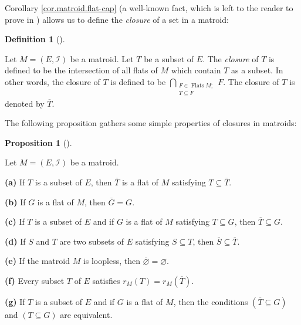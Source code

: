\documentclass[numbers=enddot,12pt,final,onecolumn,notitlepage]{scrartcl}%
\theoremstyle{definition}
\newtheorem{prop}[theo]{Proposition}
\newenvironment{proposition}[1][]
{\begin{prop}[#1]\begin{leftbar}}
{\end{leftbar}\end{prop}}
\newtheorem{defi}[theo]{Definition}
\newenvironment{definition}[1][]
{\begin{defi}[#1]\begin{leftbar}}
{\end{leftbar}\end{defi}}
\let\bigcapnonlimits\bigcap
\renewcommand{\bigcap}{\bigcapnonlimits\limits}
\begin{document}
Corollary \ref{cor.matroid.flat-cap} (a well-known fact, which is left to the
reader to prove in \cite[\S 3.1]{Stanley}) allows us to define the
\emph{closure} of a set in a matroid:

\begin{definition}
\label{def.matroid.closure}Let $M=\left(  E,\mathcal{I}\right)  $ be a
matroid. Let $T$ be a subset of $E$. The \emph{closure} of $T$ is defined to
be the intersection of all flats of $M$ which contain $T$ as a subset. In
other words, the closure of $T$ is defined to be $\bigcap_{\substack{F\in
\operatorname*{Flats}M;\\T\subseteq F}}F$. The closure of $T$ is denoted by
$\overline{T}$.
\end{definition}

The following proposition gathers some simple properties of closures in matroids:

\begin{proposition}
\label{prop.matroid.closure.props}Let $M=\left(  E,\mathcal{I}\right)  $ be a matroid.

\textbf{(a)} If $T$ is a subset of $E$, then $\overline{T}$ is a flat of $M$
satisfying $T\subseteq\overline{T}$.

\textbf{(b)} If $G$ is a flat of $M$, then $\overline{G}=G$.

\textbf{(c)} If $T$ is a subset of $E$ and if $G$ is a flat of $M$ satisfying
$T\subseteq G$, then $\overline{T}\subseteq G$.

\textbf{(d)} If $S$ and $T$ are two subsets of $E$ satisfying $S\subseteq T$,
then $\overline{S}\subseteq\overline{T}$.

\textbf{(e)} If the matroid $M$ is loopless, then $\overline{\varnothing
}=\varnothing$.

\textbf{(f)} Every subset $T$ of $E$ satisfies $r_{M}\left(  T\right)
=r_{M}\left(  \overline{T}\right)  $.

\textbf{(g)} If $T$ is a subset of $E$ and if $G$ is a flat of $M$, then the
conditions $\left(  \overline{T}\subseteq G\right)  $ and $\left(  T\subseteq
G\right)  $ are equivalent.
\end{proposition}
\end{document}
